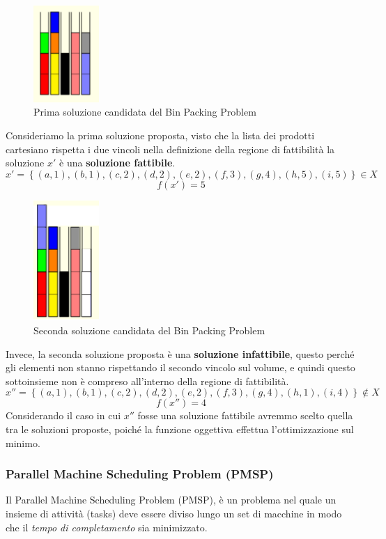 \documentclass{article}
\begin{document}
\begin{figure}[H]
    \centering
    \includegraphics[width=2.5cm]{images/sol1_BPP.png}
    \caption{Prima soluzione candidata del Bin Packing Problem}
    \label{fig:sol1_BPP}
\end{figure}

Consideriamo la prima soluzione proposta, visto che la lista dei prodotti cartesiano
rispetta i due vincoli nella definizione della regione
di fattibilità la soluzione $x'$ è una \textbf{soluzione fattibile}.
$$x'=\left\{(a,1),(b,1),(c,2),(d,2),(e,2),(f,3),(g,4),(h,5),(i,5)\right\}\in X$$
$$f(x')=5$$

\begin{figure}[H]
    \centering
    \includegraphics[width=2.5cm]{images/sol2_BPP.png}
    \caption{Seconda soluzione candidata del Bin Packing Problem}
    \label{fig:sol2_BPP}
\end{figure}

Invece, la seconda soluzione proposta è una \textbf{soluzione infattibile}, questo perché gli elementi non stanno
rispettando il secondo vincolo sul volume, e quindi
questo sottoinsieme non è compreso all'interno della regione di fattibilità.
$$x''=\left\{(a,1),(b,1),(c,2),(d,2),(e,2),(f,3),(g,4),(h,1),(i,4)\right\}\notin X$$
$$f(x'')=4$$
Considerando il caso in cui $x''$ fosse una soluzione fattibile avremmo scelto quella tra le soluzioni
proposte, poiché la funzione oggettiva effettua l'ottimizzazione sul minimo.

\subsubsection{Parallel Machine Scheduling Problem (PMSP)}
Il Parallel Machine Scheduling Problem (PMSP), è un problema nel quale un insieme di attività (tasks) deve essere diviso lungo un set di macchine in modo che
il \textit{tempo di completamento} sia minimizzato.
\end{document}
